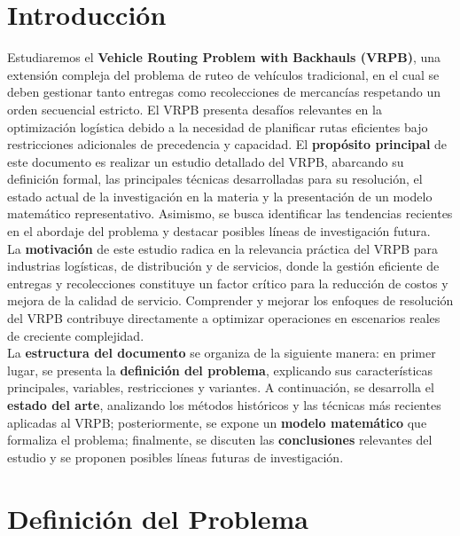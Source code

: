\documentclass[letter, 10pt]{article}
\begin{document}
\section{Introducci\'on}

Estudiaremos el \textbf{Vehicle Routing Problem with Backhauls (VRPB)}, una extensi\'on compleja del problema de ruteo de veh\'iculos tradicional, en el cual se deben gestionar tanto entregas como recolecciones de mercanc\'ias respetando un orden secuencial estricto. El VRPB presenta desaf\'ios relevantes en la optimizaci\'on log\'istica debido a la necesidad de planificar rutas eficientes bajo restricciones adicionales de precedencia y capacidad. El \textbf{prop\'osito principal} de este documento es realizar un estudio detallado del VRPB, abarcando su definici\'on formal, las principales t\'ecnicas desarrolladas para su resoluci\'on, el estado actual de la investigaci\'on en la materia y la presentaci\'on de un modelo matem\'atico representativo. Asimismo, se busca identificar las tendencias recientes en el abordaje del problema y destacar posibles l\'ineas de investigaci\'on futura.\\

La \textbf{motivaci\'on} de este estudio radica en la relevancia pr\'actica del VRPB para industrias log\'isticas, de distribuci\'on y de servicios, donde la gesti\'on eficiente de entregas y recolecciones constituye un factor cr\'itico para la reducci\'on de costos y mejora de la calidad de servicio. Comprender y mejorar los enfoques de resoluci\'on del VRPB contribuye directamente a optimizar operaciones en escenarios reales de creciente complejidad.\\

La \textbf{estructura del documento} se organiza de la siguiente manera: en primer lugar, se presenta la \textbf{definici\'on del problema}, explicando sus caracter\'isticas principales, variables, restricciones y variantes. A continuaci\'on, se desarrolla el \textbf{estado del arte}, analizando los m\'etodos hist\'oricos y las t\'ecnicas m\'as recientes aplicadas al VRPB; posteriormente, se expone un \textbf{modelo matem\'atico} que formaliza el problema; finalmente, se discuten las \textbf{conclusiones} relevantes del estudio y se proponen posibles l\'ineas futuras de investigaci\'on.


\section{Definici\'on del Problema}
\end{document}
